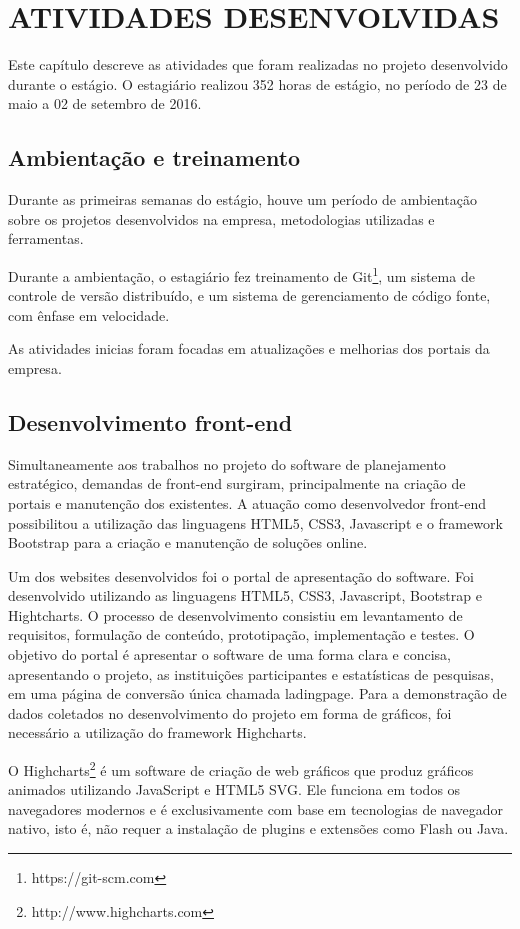 \chapter{ATIVIDADES DESENVOLVIDAS}

Este capítulo descreve as atividades que foram realizadas no projeto desenvolvido durante o estágio. O estagiário realizou 352 horas de estágio, no período de 23 de maio a 02 de setembro de 2016.

\section{Ambientação e treinamento}
Durante as primeiras semanas do estágio, houve um período de ambientação sobre os projetos desenvolvidos na empresa, metodologias utilizadas e ferramentas. 

Durante a ambientação, o estagiário fez treinamento de Git\footnote{https://git-scm.com}, um sistema de controle de versão distribuído, e um sistema de gerenciamento de código fonte, com ênfase em velocidade. 

As atividades inicias foram focadas em atualizações e melhorias dos portais da empresa.

\section{Desenvolvimento front-end}
Simultaneamente aos trabalhos no projeto do software de planejamento estratégico, demandas de front-end surgiram, principalmente na criação de portais e manutenção dos existentes. A atuação como desenvolvedor front-end possibilitou a utilização das linguagens HTML5, CSS3, Javascript e o framework Bootstrap para a criação e manutenção de soluções online.

Um dos websites desenvolvidos foi o portal de apresentação do software. Foi desenvolvido utilizando as linguagens HTML5, CSS3, Javascript, Bootstrap e Hightcharts. O processo de desenvolvimento consistiu em levantamento de requisitos, formulação de conteúdo, prototipação, implementação e testes. O objetivo do portal é apresentar o software de uma forma clara e concisa, apresentando o projeto, as instituições participantes e estatísticas de pesquisas, em uma página de conversão única chamada ladingpage. Para a demonstração de dados coletados no desenvolvimento do projeto em forma de gráficos, foi necessário a utilização do framework Highcharts.

O Highcharts\footnote{http://www.highcharts.com} é um software de criação de web gráficos que produz gráficos animados utilizando JavaScript e HTML5 SVG. Ele funciona em todos os navegadores modernos e é exclusivamente com base em tecnologias de navegador nativo, isto é, não requer a instalação de plugins e extensões como Flash ou Java.



